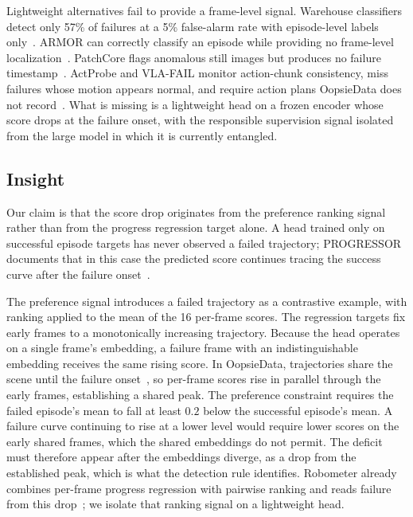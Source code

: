 \documentclass{article}
\begin{document}
Lightweight alternatives fail to provide a frame-level signal. Warehouse classifiers detect only 57\% of failures at a 5\% false-alarm rate with episode-level labels only~\citep{armbench,taskknowledge}. ARMOR can correctly classify an episode while providing no frame-level localization~\citep{armor}. PatchCore flags anomalous still images but produces no failure timestamp~\citep{patchcore}. ActProbe and VLA-FAIL monitor action-chunk consistency, miss failures whose motion appears normal, and require action plans OopsieData does not record~\citep{actprobe,vlafail}. What is missing is a lightweight head on a frozen encoder whose score drops at the failure onset, with the responsible supervision signal isolated from the large model in which it is currently entangled.

\subsection{Insight}
Our claim is that the score drop originates from the preference ranking signal rather than from the progress regression target alone. A head trained only on successful episode targets has never observed a failed trajectory; PROGRESSOR documents that in this case the predicted score continues tracing the success curve after the failure onset~\citep{progressor}.

The preference signal introduces a failed trajectory as a contrastive example, with ranking applied to the mean of the 16 per-frame scores. The regression targets fix early frames to a monotonically increasing trajectory. Because the head operates on a single frame's embedding, a failure frame with an indistinguishable embedding receives the same rising score. In OopsieData, trajectories share the scene until the failure onset~\citep{oopsiedata}, so per-frame scores rise in parallel through the early frames, establishing a shared peak. The preference constraint requires the failed episode's mean to fall at least $0.2$ below the successful episode's mean. A failure curve continuing to rise at a lower level would require lower scores on the early shared frames, which the shared embeddings do not permit. The deficit must therefore appear after the embeddings diverge, as a drop from the established peak, which is what the detection rule identifies. Robometer already combines per-frame progress regression with pairwise ranking and reads failure from this drop~\citep{robometer}; we isolate that ranking signal on a lightweight head.
\end{document}
